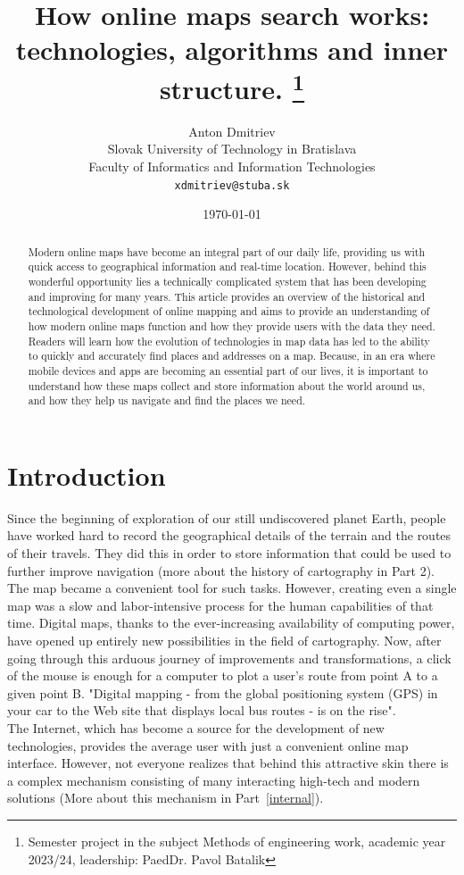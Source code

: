 \documentclass[10pt,oneside,english,a4paper]{article}
\title{How online maps search works: technologies, algorithms and inner structure.
\thanks{Semester project in the subject Methods of engineering work, academic year 2023/24, leadership: PaedDr. Pavol Batalik}}
\author{Anton Dmitriev\\[2pt]
	{\small Slovak University of Technology in Bratislava}\\
	{\small Faculty of Informatics and Information Technologies}\\
	{\small \texttt{xdmitriev@stuba.sk}}
	}
\date{\small \today}
\begin{document}
\maketitle

\begin{abstract}
	Modern online maps have become an integral part of our daily life, providing us with quick access to geographical information and real-time location. However, behind this wonderful opportunity lies a technically complicated system that has been developing and improving for many years. This article provides an overview of the historical and technological development of online mapping and aims to provide an understanding of how modern online maps function and how they provide users with the data they need. Readers will learn how the evolution of technologies in map data has led to the ability to quickly and accurately find places and addresses on a map. Because, in an era where mobile devices and apps are becoming an essential part of our lives, it is important to understand how these maps collect and store information about the world around us, and how they help us navigate and find the places we need.
\end{abstract}



\section{Introduction}
Since the beginning of exploration of our still undiscovered planet Earth, people have worked hard to record the geographical details of the terrain and the routes of their travels. They did this in order to store information that could be used to further improve navigation (more about the history of cartography in Part 2). The map became a convenient tool for such tasks. However, creating even a single map was a slow and labor-intensive process for the human capabilities of that time. Digital maps, thanks to the ever-increasing availability of computing power, have opened up entirely new possibilities in the field of cartography. Now, after going through this arduous journey of improvements and transformations, a click of the mouse is enough for a computer to plot a user's route from point A to a given point B. "Digital mapping - from the global positioning system (GPS) in your car to the Web site that displays local bus routes - is on the rise"\cite{Mitchell2005}.
\\The Internet, which has become a source for the development of new technologies, provides the average user with just a convenient online map interface. However, not everyone realizes that behind this attractive skin there is a complex mechanism consisting of many interacting high-tech and modern solutions (More about this mechanism in Part~\ref{internal}).
\end{document}
